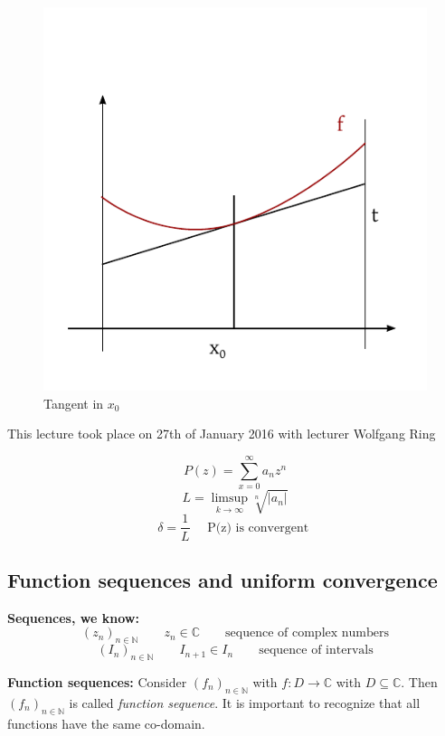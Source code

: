\documentclass[a4paper,landscape,twocolumn]{article}
\theoremstyle{definition}
\newcommand\abs[1]{\left|#1\right|}
\newcommand\seq[1]{{\left(#1\right)}_{n \in \mathbb N}}
\newcommand\meta[3]{\begin{mdframed}[skipbelow=4pt,skipabove=4pt,innermargin=1pt,innerleftmargin=1pt,innerrightmargin=1pt]\begin{center}\small{\textdownarrow{} This #1 took place on #2 with lecturer #3}\end{center}\end{mdframed}}
\begin{document}
\begin{figure}[!h]
  \begin{center}
    \includegraphics{img/tangent_convex.pdf}
    \caption{Tangent in $x_0$}
    \label{img:tangent-convex}
  \end{center}
\end{figure}

\meta{lecture}{27th of January 2016}{Wolfgang Ring}

\[ P(z) = \sum_{x=0}^\infty a_n z^n \]
\[ L = \limsup_{k\to\infty} \sqrt[n]{\abs{a_n}} \]
\[ \delta = \frac1L \quad \text{ P(z) is convergent } \]

\subsection{Function sequences and uniform convergence}

\textbf{Sequences, we know:}
\[ \seq{z_n} \qquad z_n \in \mathbb C \qquad \text{sequence of complex numbers} \]
\[ \seq{I_n} \qquad I_{n+1} \in I_n \qquad \text{sequence of intervals} \]

\textbf{Function sequences:}
Consider $\seq{f_n}$ with $f: D \to \mathbb C$ with $D \subseteq \mathbb C$.
Then $\seq{f_n}$ is called \emph{function sequence}. It is important to recognize
that all functions have the same co-domain.
\end{document}
